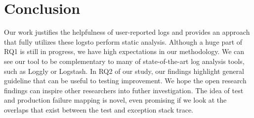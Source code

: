\section{Conclusion}

Our work justifies the helpfulness of user-reported logs and provides an approach that fully utilizes these logsto perform static analysis. Although a huge part of RQ1 is still in progress, we have high expectations in our methodology. We can see our tool to be complementary to many of state-of-the-art log analysis tools, such as Loggly or Logstash. In RQ2 of our study, our findings highlight general guideline that can be useful to testing improvement. We hope the open research findings can inspire other researchers into futher investigation. The idea of test and production failure mapping is novel, even promising if we look at the overlaps that exist between the test and exception stack trace. 